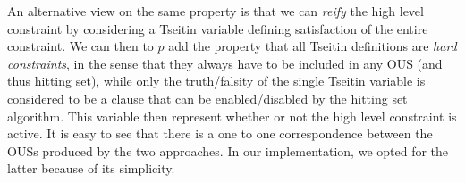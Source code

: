 An alternative view on the same property is that we can \emph{reify} the high level constraint by considering a Tseitin variable defining satisfaction of the entire constraint. 
We can then to $p$ add the property that all Tseitin definitions are \emph{hard constraints}, in the sense that they always have to be included in any OUS (and thus hitting set), while only the truth/falsity of the single Tseitin variable is considered to be a clause that can be enabled/disabled by the hitting set algorithm. 
This variable then represent whether or not the high level constraint is active.
It is easy to see that there is a one to one correspondence between the OUSs produced by the two approaches. In our implementation, we opted for the latter because of its simplicity. 


 
